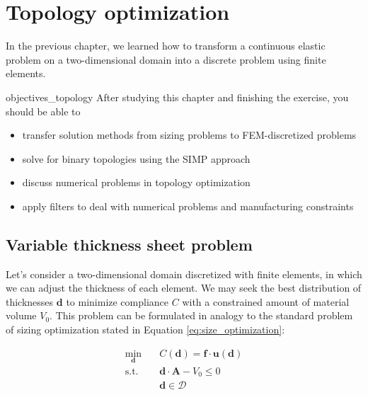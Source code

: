 \chapter{Topology optimization}
In the previous chapter, we learned how to transform a continuous elastic problem on a two-dimensional domain into a discrete problem using finite elements. 

\begin{objectives}{}{objectives_topology}
After studying this chapter and finishing the exercise, you should be able to 
\begin{itemize}[label=$\dots$]
    \item transfer solution methods from sizing problems to FEM-discretized problems
    \item solve for binary topologies using the SIMP approach
    \item discuss numerical problems in topology optimization
    \item apply filters to deal with numerical problems and manufacturing constraints
\end{itemize}
\end{objectives}

\section{Variable thickness sheet problem}
Let's consider a two-dimensional domain discretized with finite elements, in which we can adjust the thickness of each element. We may seek the best distribution of thicknesses $\mathbf{d}$ to minimize compliance $C$ with a constrained amount of material volume $V_0$. This problem can be formulated in analogy to the standard problem of sizing optimization stated in Equation \eqref{eq:size_optimization}: 

\begin{equation}
    \begin{aligned}
        \min_{\mathbf{d}} \quad & C(\mathbf{d}) = \mathbf{f} \cdot \mathbf{u}(\mathbf{d})\\
        \textrm{s.t.} \quad & \mathbf{d} \cdot \mathbf{A} - V_0 \le 0  \\
                            & \mathbf{d} \in \mathcal{D}\\
    \end{aligned}
    \label{eq:sheet_optimization}
\end{equation}

